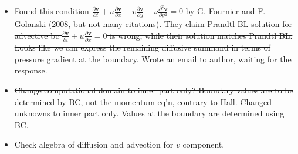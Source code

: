 \documentclass{article}
\begin{document}
{\begin{itemize}
    \item  \st{Found this condition $\frac{\partial \boldsymbol{v}}{\partial t}+u \frac{\partial \boldsymbol{v}}{\partial x}+v \frac{\partial \boldsymbol{v}}{\partial y}-\nu \frac{\partial^2 \boldsymbol{v}}{\partial y^2}=0$ by G. Fournier and F. Golanski (2008, but not many citations). They claim Prandtl BL solution for advective bc $\frac{\partial \boldsymbol{v}}{\partial t} + u\frac{\partial \boldsymbol{v}}{\partial x}=0$ is wrong, while their solution matches Prandtl BL. Looks like we can express the remaining diffusive summand in terms of pressure gradient at the boundary.} Wrote an email to author, waiting for the response. 
    \item \st{Change computational domain to inner part only? Boundary values are to be determined by BC, not the momentum eq'n, contrary to Hall}\cite{Hall:1980}. Changed unknowns to inner part only. Values at the boundary are determined using BC. 
    \item Check algebra of diffusion and advection for $v$ component.
  \end{itemize}
}
\end{document}
